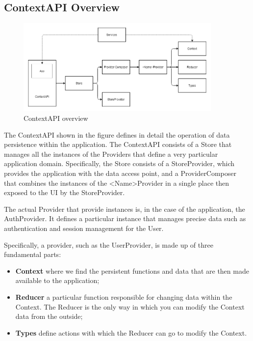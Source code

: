 \subsection{ContextAPI Overview} \label{_contextAPI}

\begin{figure}[H]
    \centering
    \includegraphics[width=0.9\textwidth]{res/images/frontend-diagrams/ContextAPI.png}
    \caption{ContextAPI overview}
\end{figure}

The ContextAPI shown in the figure defines in detail the operation of data persistence within the application. The ContextAPI consists of a Store that manages all the instances of the Providers that define a very particular application domain. Specifically, the Store consists of a StoreProvider, which provides the application with the data access point, and a ProviderComposer that combines the instances of the <Name>Provider in a single place then exposed to the UI by the StoreProvider.

The actual Provider that provide instances is, in the case of the application, the AuthProvider. It defines a particular instance that manages precise data such as authentication and session management for the User.



Specifically, a provider, such as the UserProvider, is made up of three fundamental parts:

\begin{itemize}
    \item \textbf{Context} where we find the persistent functions and data that are then made available to the application;
    \item \textbf{Reducer} a particular function responsible for changing data within the Context. The Reducer is the only way in which you can modify the Context data from the outside; 
    \item \textbf{Types} define actions with which the Reducer can go to modify the Context.
\end{itemize}

